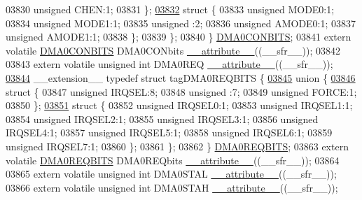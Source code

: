 \begin{DoxyCode}
03830       \textcolor{keywordtype}{unsigned} CHEN:1;
03831     \};
\hypertarget{a00015_source_l03832}{}\hyperlink{a00015}{03832}     \textcolor{keyword}{struct }\{
03833       \textcolor{keywordtype}{unsigned} MODE0:1;
03834       \textcolor{keywordtype}{unsigned} MODE1:1;
03835       \textcolor{keywordtype}{unsigned} :2;
03836       \textcolor{keywordtype}{unsigned} AMODE0:1;
03837       \textcolor{keywordtype}{unsigned} AMODE1:1;
03838     \};
03839   \};
03840 \} \hyperlink{a00014_d7/d93/a00397}{DMA0CONBITS};
03841 \textcolor{keyword}{extern} \textcolor{keyword}{volatile} \hyperlink{a00014_d7/d93/a00397}{DMA0CONBITS} DMA0CONbits \hyperlink{a00015_a493c46f03454991ccc5aa7a6e1dfb2a7}{\_\_attribute\_\_}((\_\_sfr\_\_));
03842 
03843 \textcolor{keyword}{extern} \textcolor{keyword}{volatile} \textcolor{keywordtype}{unsigned} \textcolor{keywordtype}{int}  DMA0REQ \hyperlink{a00015_a493c46f03454991ccc5aa7a6e1dfb2a7}{\_\_attribute\_\_}((\_\_sfr\_\_));
\hypertarget{a00015_source_l03844}{}\hyperlink{a00014}{03844} \_\_extension\_\_ \textcolor{keyword}{typedef} \textcolor{keyword}{struct }tagDMA0REQBITS \{
\hypertarget{a00015_source_l03845}{}\hyperlink{a00015}{03845}   \textcolor{keyword}{union }\{
\hypertarget{a00015_source_l03846}{}\hyperlink{a00015}{03846}     \textcolor{keyword}{struct }\{
03847       \textcolor{keywordtype}{unsigned} IRQSEL:8;
03848       \textcolor{keywordtype}{unsigned} :7;
03849       \textcolor{keywordtype}{unsigned} FORCE:1;
03850     \};
\hypertarget{a00015_source_l03851}{}\hyperlink{a00015}{03851}     \textcolor{keyword}{struct }\{
03852       \textcolor{keywordtype}{unsigned} IRQSEL0:1;
03853       \textcolor{keywordtype}{unsigned} IRQSEL1:1;
03854       \textcolor{keywordtype}{unsigned} IRQSEL2:1;
03855       \textcolor{keywordtype}{unsigned} IRQSEL3:1;
03856       \textcolor{keywordtype}{unsigned} IRQSEL4:1;
03857       \textcolor{keywordtype}{unsigned} IRQSEL5:1;
03858       \textcolor{keywordtype}{unsigned} IRQSEL6:1;
03859       \textcolor{keywordtype}{unsigned} IRQSEL7:1;
03860     \};
03861   \};
03862 \} \hyperlink{a00014_d9/d95/a00400}{DMA0REQBITS};
03863 \textcolor{keyword}{extern} \textcolor{keyword}{volatile} \hyperlink{a00014_d9/d95/a00400}{DMA0REQBITS} DMA0REQbits \hyperlink{a00015_a493c46f03454991ccc5aa7a6e1dfb2a7}{\_\_attribute\_\_}((\_\_sfr\_\_));
03864 
03865 \textcolor{keyword}{extern} \textcolor{keyword}{volatile} \textcolor{keywordtype}{unsigned} \textcolor{keywordtype}{int}  DMA0STAL \hyperlink{a00015_a493c46f03454991ccc5aa7a6e1dfb2a7}{\_\_attribute\_\_}((\_\_sfr\_\_));
03866 \textcolor{keyword}{extern} \textcolor{keyword}{volatile} \textcolor{keywordtype}{unsigned} \textcolor{keywordtype}{int}  DMA0STAH \hyperlink{a00015_a493c46f03454991ccc5aa7a6e1dfb2a7}{\_\_attribute\_\_}((\_\_sfr\_\_));

\end{DoxyCode}
